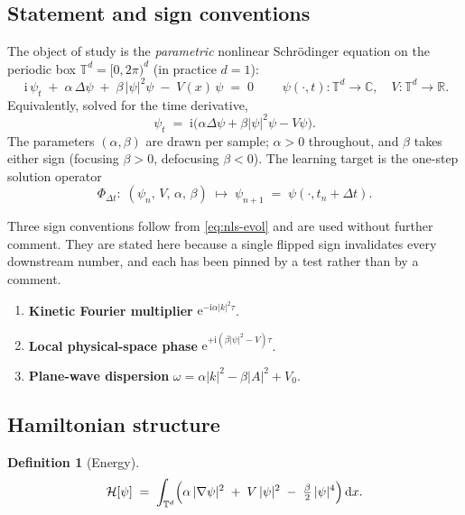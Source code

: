 \documentclass[11pt,a4paper]{article}
\theoremstyle{plain}
\theoremstyle{definition}
\newtheorem{definition}[theorem]{Definition}
\theoremstyle{remark}
\newcommand{\R}{\mathbb{R}}
\newcommand{\C}{\mathbb{C}}
\newcommand{\T}{\mathbb{T}}
\newcommand{\iu}{\mathrm{i}}
\newcommand{\eu}{\mathrm{e}}
\newcommand{\dd}{\,\mathrm{d}}
\newcommand{\lap}{\Delta}
\newcommand{\dt}{\Delta t}
\newcommand{\Flow}{\Phi}
\newcommand{\Ham}{\mathcal{H}}
\begin{document}
\subsection{Statement and sign conventions}

The object of study is the \emph{parametric} nonlinear Schr\"odinger equation on the
periodic box $\T^d = [0,2\pi)^d$ (in practice $d=1$):
\begin{equation}
\label{eq:nls}
\boxed{\;\iu\,\psi_t \;+\; \alpha\,\lap\psi \;+\; \beta\,|\psi|^2\psi \;-\; V(x)\,\psi \;=\; 0\;}
\qquad \psi(\cdot,t):\T^d\to\C,\quad V:\T^d\to\R .
\end{equation}
Equivalently, solved for the time derivative,
\begin{equation}
\label{eq:nls-evol}
\psi_t \;=\; \iu\bigl(\alpha\lap\psi + \beta|\psi|^2\psi - V\psi\bigr).
\end{equation}
The parameters $(\alpha,\beta)$ are drawn per sample; $\alpha>0$ throughout, and
$\beta$ takes either sign (focusing $\beta>0$, defocusing $\beta<0$). The learning
target is the one-step solution operator
\[
\Flow_{\dt}:\;(\psi_n,\,V,\,\alpha,\,\beta)\;\longmapsto\;\psi_{n+1}\;=\;\psi(\cdot,t_n+\dt).
\]

Three sign conventions follow from \eqref{eq:nls-evol} and are used without further
comment. They are stated here because a single flipped sign invalidates every
downstream number, and each has been pinned by a test rather than by a comment.

\begin{enumerate}[leftmargin=1.4em,itemsep=0.25em]
\item \textbf{Kinetic Fourier multiplier} $\eu^{-\iu\alpha|k|^2\tau}$.
\item \textbf{Local physical-space phase} $\eu^{+\iu(\beta|\psi|^2 - V)\tau}$.
\item \textbf{Plane-wave dispersion} $\omega = \alpha|k|^2 - \beta|A|^2 + V_0$.
\end{enumerate}

\subsection{Hamiltonian structure}

\begin{definition}[Energy]
\label{def:hamiltonian}
\[
\Ham[\psi] \;=\; \int_{\T^d}\Bigl(\alpha\,|\nabla\psi|^2 \;+\; V\,|\psi|^2 \;-\; \tfrac{\beta}{2}\,|\psi|^4\Bigr)\dd x .
\]
\end{definition}
\end{document}
